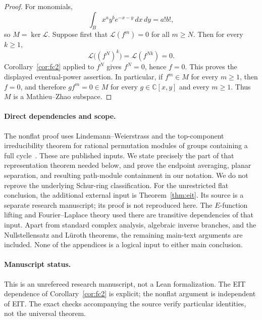 \documentclass[11pt]{article}
\numberwithin{equation}{section}
\theoremstyle{definition}\newtheorem{definition}[theorem]{Definition}
\theoremstyle{remark}\newtheorem{remark}[theorem]{Remark}
\newcommand{\C}{\mathbb C}
\newcommand{\Lfac}{\mathcal L}
\newcommand{\dd}{\,d}
\begin{document}
\begin{proof}
For monomials,
\[
 \int_B x^a y^b e^{-x-y}\dd x\dd y=a!b!,
\]
so $M=\ker\Lfac$. Suppose first that
$\Lfac(f^m)=0$ for all $m\ge N$. Then for every $k\ge1$,
\[
 \Lfac\bigl((f^N)^k\bigr)=\Lfac(f^{Nk})=0.
\]
Corollary~\ref{cor:fc2} applied to $f^N$ gives $f^N=0$, hence $f=0$.
This proves the displayed eventual-power assertion. In particular, if
$f^m\in M$ for every $m\ge1$, then $f=0$, and therefore
$gf^m=0\in M$ for every $g\in\C[x,y]$ and every $m\ge1$.
Thus $M$ is a Mathieu--Zhao subspace.
\end{proof}

\paragraph{Direct dependencies and scope.}
The nonflat proof uses Lindemann--Weierstrass and the top-component
irreducibility theorem for rational permutation modules of groups
containing a full cycle~\cite[Theorem~3.1 and Section~4.1]{PM}.
These are published inputs. We state precisely the part
of that representation theorem needed below, and prove the endpoint
averaging, planar separation, and resulting path-module containment in
our notation. We do not reprove the underlying Schur-ring classification.
For the unrestricted flat conclusion, the additional external input is
Theorem~\ref{thm:eit}. Its source is a separate research manuscript;
its proof is not reproduced here. The $E$-function lifting and
Fourier--Laplace theory used there are transitive dependencies of that
input. Apart from standard complex analysis, algebraic inverse branches,
and the Nullstellensatz and L\"uroth theorems, the remaining main-text
arguments are included. None of the appendices is a logical input to
either main conclusion.
\paragraph{Manuscript status.}
This is an unrefereed research manuscript, not a Lean formalization.
The EIT dependence of Corollary~\ref{cor:fc2} is explicit; the nonflat
argument is independent of EIT. The exact checks accompanying the source
verify particular identities, not the universal theorem.
\end{document}
